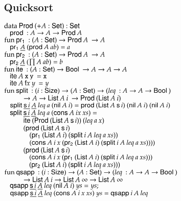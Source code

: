 \subsection{Quicksort}
\begin{bsp}
$\data \ProdT ( + A : \Set) : \Set$\\
$\spc  \prd : A \ra A \ra \ProdT A$\\
$\fun \pra : ( A : \Set ) \ra \ProdT A\: \ra A$\\
$\spc \pra \inacc{A}\: (\prd A\: a b) = a$\\
$\fun \prb : ( A : \Set ) \ra \ProdT A\: \ra A$\\
$\spc \prb \inacc{A}\: (\prod A\: a b) = b$\\
$\fun \ite : (A : \Set ) \ra \Bool \ra A \ra A \ra A$\\
$\spc \ite A\: \tt x\: y\: = x$\\
$\spc \ite A\: \ff x\: y\: = y$\\
$\fun \pivot : (i : \Size ) \ra (A : \Set ) \ra ( \lleq : A \ra A \ra \Bool )$\\ 
$\spcx	\ra A \ra \List A\: i\: \ra \ProdT (\List A\: i)$\\
$\spc\pivot \inacc{\s i}\:     \inacc{A}\: \lleq a\: (\nil A\: i) = \prd (\List A\: \s i)\:(\nil A\: i)\:(\nil A\: i)$\\
$\spc \pivot \inacc{\s i}\:    \inacc{A}\: \lleq a\: (\cons A\: i x\: xs) =$\\ 
$\spcx     \ite (\ProdT (\List A\: \s i))\: (\lleq a\: x)$\\ 
$\spcx    (\prd (\List A\: \s i)$\\
$\spcx \spc       (\pra (\List A\: i)\: (\pivot i\: A\: \lleq a\: xs)) $\\
$\spcx \spc	(\cons A\: i\: x\: (\prb (\List A\: i) \: (\pivot i\: A\: \lleq a\: xs))))$\\ 
$\spcx     (\prd (\List A\: \s i)$\\
$\spcx	\spc (\cons A\: i\: x\: (\pra (\List A\: i)\: (\pivot i\: A\: \lleq a\: xs)))$\\
$\spcx  \spc (\prb (\List A\: i)\: (\pivot i\: A\: \lleq a\: xs)))$\\
$ \fun \qsapp : (i : \Size ) \ra ( A : \Set ) \ra ( \lleq : A \ra A \ra \Bool )$\\ 
$\spcx	\ra \List A\: i \ra \List A\: \infty \ra \List A\: \infty$\\
$\spc \qsapp \inacc{\s i}\: \inacc{A}\: \lleq (\nil A\: i) \:      ys = ys;$\\
$\spc \qsapp \inacc{\s i}\: \inacc{A}\: \lleq (\cons A\: i\: x\: xs) \: ys = \qsapp i\: A\: \lleq$\\ 

\end{bsp}
